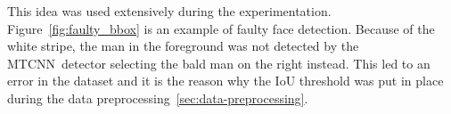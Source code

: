 This idea was used extensively during the experimentation.
Figure~\ref{fig:faulty_bbox} is an example of faulty face detection.
Because of the white stripe, the man in the foreground was not detected by the MTCNN detector selecting the bald man
on the right instead.
This led to an error in the dataset and it is the reason why the IoU threshold was put in place during the data
preprocessing~\ref{sec:data-preprocessing}.